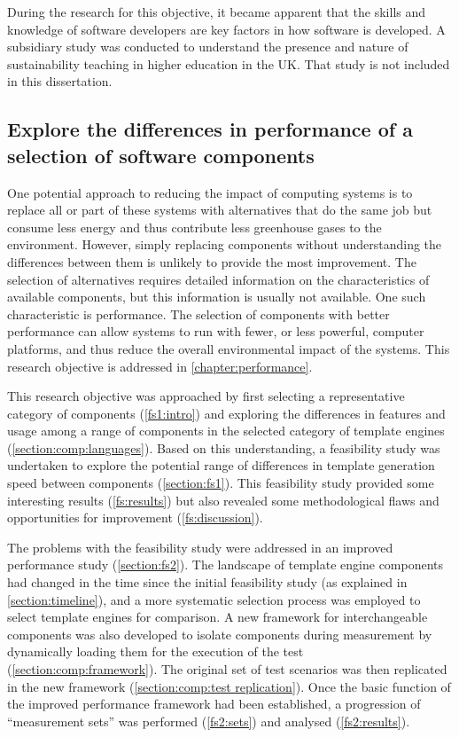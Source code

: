 During the research for this objective, it became apparent that the skills and knowledge of software developers are key factors in how software is developed. A subsidiary study was conducted to understand the presence and nature of sustainability teaching in higher education in the UK. That study is not included in this dissertation.


\subsection{Explore the differences in performance of a selection of software components}

One potential approach to reducing the impact of computing systems is to replace all or part of these systems with alternatives that do the same job but consume less energy and thus contribute less greenhouse gases to the environment. However, simply replacing components without understanding the differences between them is unlikely to provide the most improvement. The selection of alternatives requires detailed information on the characteristics of available components, but this information is usually not available. One such characteristic is performance. The selection of components with better performance can allow systems to run with fewer, or less powerful, computer platforms, and thus reduce the overall environmental impact of the systems. This research objective is addressed in \autoref{chapter:performance}.

This research objective was approached by first selecting a representative category of components (\autoref{fs1:intro}) and exploring the differences in features and usage among a range of components in the selected category of \gls{template engine}s (\autoref{section:comp:languages}). Based on this understanding, a feasibility study was undertaken to explore the potential range of differences in template generation speed between components (\autoref{section:fs1}). This feasibility study provided some interesting results (\autoref{fs:results}) but also revealed some methodological flaws and opportunities for improvement (\autoref{fs:discussion}).

The problems with the feasibility study were addressed in an improved performance study (\autoref{section:fs2}). The landscape of \gls{template engine} components had changed in the time since the initial feasibility study (as explained in \autoref{section:timeline}), and a more systematic selection process was employed to select \gls{template engine}s for comparison. A new framework for interchangeable components was also developed to isolate components during measurement by dynamically loading them for the execution of the test (\autoref{section:comp:framework}). The original set of test scenarios was then replicated in the new framework (\autoref{section:comp:test replication}). Once the basic function of the improved performance framework had been established, a progression of \enquote{measurement sets} was performed (\autoref{fs2:sets}) and analysed (\autoref{fs2:results}).

